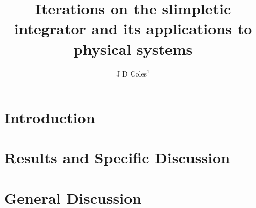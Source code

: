 \documentclass[10pt]{iopart}
\begin{document}
	\title{Iterations on the slimpletic integrator and its applications to physical systems}
	\author{J D Coles$^1$}
	\address{$^1$ Department of Physics, University of Bath, Claverton Down, Bath BA2 7AY, UK}
	
\begin{abstract}
\lipsum[1]
\end{abstract}
\maketitle
\ioptwocol

\section{Introduction}

\lipsum

\section{Results and Specific Discussion}

\lipsum

\section{General Discussion}

\lipsum



\end{document}
